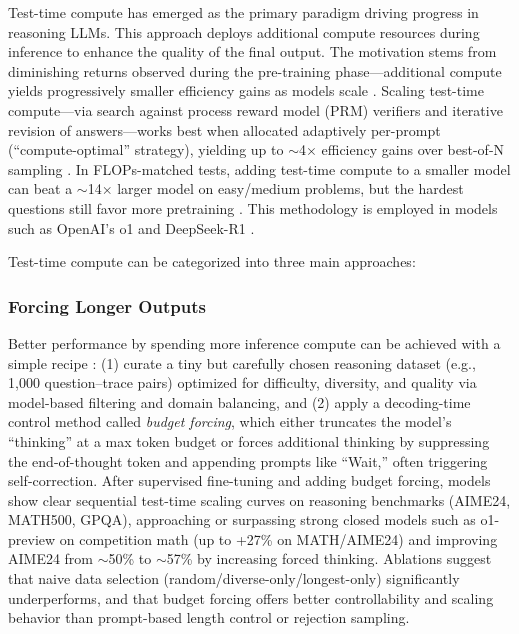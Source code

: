 \documentclass[12pt]{article}
\begin{document}
Test-time compute has emerged as the primary paradigm driving progress in reasoning LLMs. This approach deploys additional compute resources during inference to enhance the quality of the final output. The motivation stems from diminishing returns observed during the pre-training phase---additional compute yields progressively smaller efficiency gains as models scale \cite{kaplan2020scaling}. Scaling test-time compute---via search against process reward model (PRM) verifiers and iterative revision of answers---works best when allocated adaptively per-prompt (``compute-optimal'' strategy), yielding up to $\sim$4$\times$ efficiency gains over best-of-N sampling \cite{snell2024scalingllmtesttimecompute}. In FLOPs-matched tests, adding test-time compute to a smaller model can beat a $\sim$14$\times$ larger model on easy/medium problems, but the hardest questions still favor more pretraining \cite{snell2024scalingllmtesttimecompute}. This methodology is employed in models such as OpenAI's o1 \cite{openai2024reasoning} and DeepSeek-R1 \cite{guo2025deepseek}.

Test-time compute can be categorized into three main approaches:

\subsubsection{Forcing Longer Outputs}

Better performance by spending more inference compute can be achieved with a simple recipe \cite{muennighoff2025s1simpletesttimescaling}: (1) curate a tiny but carefully chosen reasoning dataset (e.g., 1,000 question--trace pairs) optimized for difficulty, diversity, and quality via model-based filtering and domain balancing, and (2) apply a decoding-time control method called \textit{budget forcing}, which either truncates the model's ``thinking'' at a max token budget or forces additional thinking by suppressing the end-of-thought token and appending prompts like ``Wait,'' often triggering self-correction. After supervised fine-tuning and adding budget forcing, models show clear sequential test-time scaling curves on reasoning benchmarks (AIME24, MATH500, GPQA), approaching or surpassing strong closed models such as o1-preview on competition math (up to +27\% on MATH/AIME24) and improving AIME24 from $\sim$50\% to $\sim$57\% by increasing forced thinking. Ablations suggest that naive data selection (random/diverse-only/longest-only) significantly underperforms, and that budget forcing offers better controllability and scaling behavior than prompt-based length control or rejection sampling.
\end{document}
